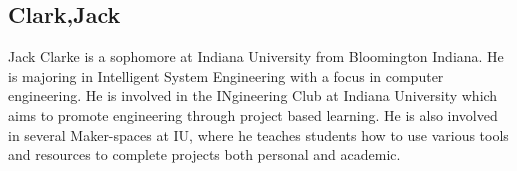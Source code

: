 \subsection{Clark,Jack}
Jack Clarke is a sophomore at Indiana University from Bloomington Indiana. He is majoring in Intelligent System Engineering with a focus in computer engineering. He is involved in the INgineering Club at Indiana University which aims to promote engineering through project based learning. He is also involved in several Maker-spaces at IU, where he teaches students how to use various tools and resources to complete projects both personal and academic.
